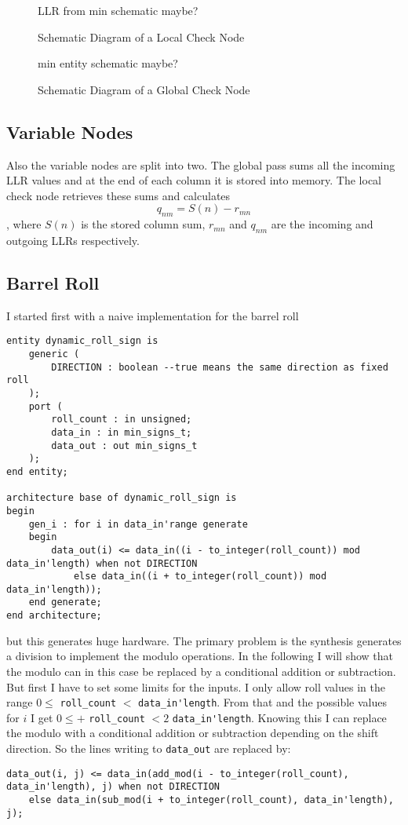 \begin{figure}
    LLR from min schematic maybe?
    \centering
    \caption{Schematic Diagram of a Local Check Node}
\end{figure}

\begin{figure}
    min entity schematic maybe?
    \centering
    \caption{Schematic Diagram of a Global Check Node}
\end{figure}

\subsection{Variable Nodes}
Also the variable nodes are split into two. The global pass sums all the incoming LLR values and at the end of each column it is stored into memory. The local check node retrieves these sums and calculates
\begin{equation}
    q_{nm} = S(n) - r_{mn}
\end{equation}
, where $S(n)$ is the stored column sum, $r_{mn}$ and $q_{nm}$ are the incoming and outgoing LLRs respectively.

\subsection{Barrel Roll}
I started first with a naive implementation for the barrel roll
\begin{lstlisting}[style=vhdl]
    entity dynamic_roll_sign is
	generic (
		DIRECTION : boolean --true means the same direction as fixed roll
	);
    port (
		roll_count : in unsigned;
        data_in : in min_signs_t;
		data_out : out min_signs_t
    );
end entity;

architecture base of dynamic_roll_sign is
begin
    gen_i : for i in data_in'range generate
    begin
        data_out(i) <= data_in((i - to_integer(roll_count)) mod data_in'length) when not DIRECTION 
            else data_in((i + to_integer(roll_count)) mod data_in'length));
    end generate;
end architecture;
\end{lstlisting}
but this generates huge hardware. The primary problem is the synthesis generates a division to implement the modulo operations. In the following I will show that the modulo can in this case be replaced by a conditional addition or subtraction. But first I have to set some limits for the inputs. I only allow roll values in the range $0 \leq$ \lstinline{roll_count} $<$ \lstinline{data_in'length}. From that and the possible values for $i$ I get $0 \leq + $ \lstinline{roll_count} $ < 2$ \lstinline{data_in'length}. Knowing this I can replace the modulo with a conditional addition or subtraction depending on the shift direction. So the lines writing to \lstinline{data_out} are replaced by:
\begin{lstlisting}
data_out(i, j) <= data_in(add_mod(i - to_integer(roll_count), data_in'length), j) when not DIRECTION 
    else data_in(sub_mod(i + to_integer(roll_count), data_in'length), j);
\end{lstlisting}

